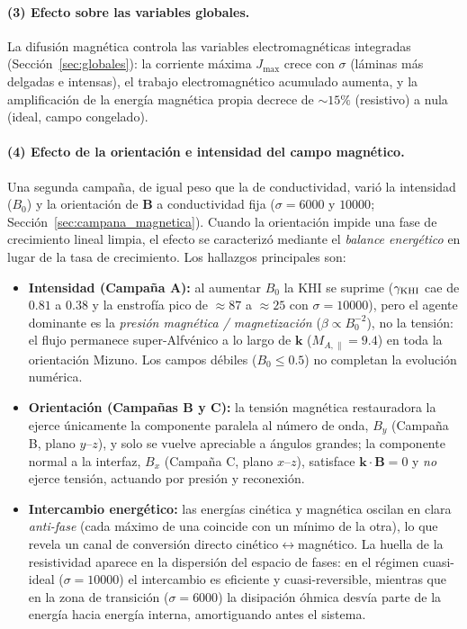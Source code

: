 \paragraph{(3) Efecto sobre las variables globales.}
La difusión magnética controla las variables electromagnéticas integradas (Sección~\ref{sec:globales}): la corriente máxima $J_{\max}$ crece con $\sigma$ (láminas más delgadas e intensas), el trabajo electromagnético acumulado aumenta, y la amplificación de la energía magnética propia decrece de $\sim15\%$ (resistivo) a nula (ideal, campo congelado). 

\paragraph{(4) Efecto de la orientación e intensidad del campo magnético.}
Una segunda campaña, de igual peso que la de conductividad, varió la intensidad ($B_0$) y la orientación de $\mathbf B$ a conductividad fija ($\sigma=6000$ y $10000$; Sección~\ref{sec:campana_magnetica}). Cuando la orientación impide una fase de crecimiento lineal limpia, el efecto se caracterizó mediante el \emph{balance energético} en lugar de la tasa de crecimiento. Los hallazgos principales son:
\begin{itemize}
\item \textbf{Intensidad (Campaña A):} al aumentar $B_0$ la KHI se suprime ($\gamma_{\mathrm{KHI}}$ cae de $0.81$ a $0.38$ y la enstrofía pico de $\approx87$ a $\approx25$ con $\sigma=10000$), pero el agente dominante es la \emph{presión magnética / magnetización} ($\beta\propto B_0^{-2}$), no la tensión: el flujo permanece super-Alfvénico a lo largo de $\mathbf k$ ($M_{A,\parallel}=9.4$) en toda la orientación Mizuno. Los campos débiles ($B_0\le0.5$) no completan la evolución numérica.
\item \textbf{Orientación (Campañas B y C):} la tensión magnética restauradora la ejerce únicamente la componente paralela al número de onda, $B_y$ (Campaña B, plano $y$--$z$), y solo se vuelve apreciable a ángulos grandes; la componente normal a la interfaz, $B_x$ (Campaña C, plano $x$--$z$), satisface $\mathbf k\cdot\mathbf B=0$ y \emph{no} ejerce tensión, actuando por presión y reconexión.
\item \textbf{Intercambio energético:} las energías cinética y magnética oscilan en clara \emph{anti-fase} (cada máximo de una coincide con un mínimo de la otra), lo que revela un canal de conversión directo cinético$\leftrightarrow$magnético. La huella de la resistividad aparece en la dispersión del espacio de fases: en el régimen cuasi-ideal ($\sigma=10000$) el intercambio es eficiente y cuasi-reversible, mientras que en la zona de transición ($\sigma=6000$) la disipación óhmica desvía parte de la energía hacia energía interna, amortiguando antes el sistema.
\end{itemize}

